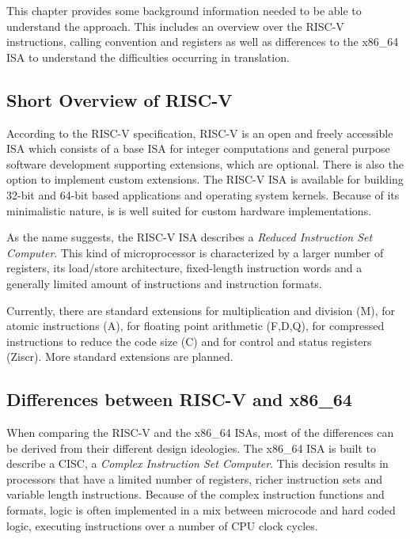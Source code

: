 \documentclass[course=eragp]{aspdoc}
\begin{document}
This chapter provides some background information needed to be able to understand the approach. This
includes an overview over the RISC-V instructions, calling convention and registers as well as
differences to the x86\_64 ISA to understand the difficulties occurring in translation.

\subsection{Short Overview of RISC-V}

According to the RISC-V specification, RISC-V is an open and freely accessible ISA
which consists of a base ISA for integer computations and general purpose software development
supporting extensions, which are optional. There is also the
option to implement custom extensions. The RISC-V ISA is available for building 32-bit and 64-bit based
applications and operating system kernels. Because of its minimalistic nature, is is well suited for
custom hardware implementations.~\cite{rvspec}

\par

As the name suggests, the
RISC-V ISA describes a \emph{Reduced Instruction Set Computer}. This kind of microprocessor is
characterized by a larger number of
registers, its load/store architecture, fixed-length instruction words and a generally limited
amount of instructions and instruction formats.~\cite{RISCvCISC}

\par

Currently, there are standard extensions for multiplication and division (M), for atomic instructions
(A), for floating point arithmetic (F,D,Q), for compressed instructions to reduce the code size (C)
and for control and status registers (Ziscr). More standard extensions are planned.~\cite{rvspec}

\subsection{Differences between RISC-V and x86\_64}
When comparing the RISC-V and the x86\_64 ISAs, most of the differences can be derived from their
different design ideologies. The x86\_64 ISA is built to describe a CISC, a \emph{Complex Instruction Set Computer}.
This decision results in processors that have a limited number of registers, richer instruction sets and variable length
instructions. Because of the complex instruction functions and formats, logic is often implemented
in a mix between microcode and hard coded logic, executing instructions over a number of CPU clock
cycles.~\cite{RISCvCISC}
\end{document}
